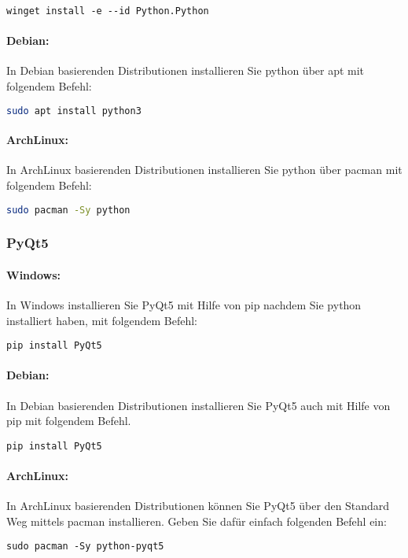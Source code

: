 \documentclass[a4paper,ngerman,headsepline, titlepage=firstiscover]{scrartcl}
\begin{document}
\begin{lstlisting}[style=simple]
 winget install -e --id Python.Python
\end{lstlisting}

\paragraph{Debian:} In Debian basierenden Distributionen installieren Sie python über apt mit folgendem Befehl:

\begin{lstlisting}[style=simple, language=Bash]
 sudo apt install python3
\end{lstlisting}

\paragraph{ArchLinux:} In ArchLinux basierenden Distributionen installieren Sie python über pacman mit folgendem Befehl:

\begin{lstlisting}[style=simple, language=Bash]
 sudo pacman -Sy python
\end{lstlisting}

\subsubsection{PyQt5}
\paragraph{Windows:} In Windows installieren Sie PyQt5 mit Hilfe von pip nachdem Sie python installiert haben, mit folgendem Befehl:
\begin{lstlisting}[style=simple]
 pip install PyQt5
\end{lstlisting}

\paragraph{Debian:} In Debian basierenden Distributionen installieren Sie PyQt5 auch mit Hilfe von pip mit folgendem Befehl.
\begin{lstlisting}[style=simple]
 pip install PyQt5
\end{lstlisting}

\paragraph{ArchLinux:} In ArchLinux basierenden Distributionen können Sie PyQt5 über den Standard Weg mittels pacman installieren. Geben Sie dafür einfach folgenden Befehl ein:
\begin{lstlisting}[style=simple]
 sudo pacman -Sy python-pyqt5
\end{lstlisting}
\end{document}
